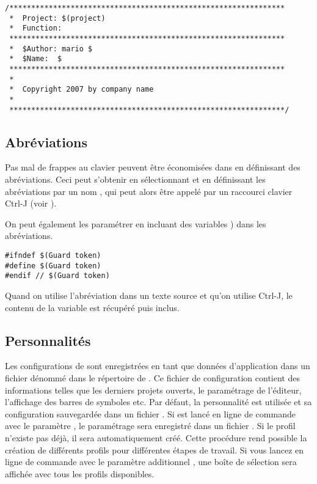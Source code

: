 
\begin{lstlisting}
/***************************************************************
 *  Project: $(project)
 *  Function:
 ***************************************************************
 *  $Author: mario $
 *  $Name:  $
 ***************************************************************
 *
 *  Copyright 2007 by company name
 *
 ***************************************************************/
\end{lstlisting}

\subsection{Abréviations}\label{sec:Abbreviations}

Pas mal de frappes au clavier peuvent être économisées dans \codeblocks en définissant des abréviations. Ceci peut s'obtenir en sélectionnant  et en définissant les abréviations par un nom , qui peut alors être appelé par un raccourci clavier Ctrl-J (voir ).


On peut également les paramétrer en incluant des variables ) dans les abréviations.

\begin{lstlisting}
#ifndef $(Guard token)
#define $(Guard token)
#endif // $(Guard token)
\end{lstlisting}

Quand on utilise l'abréviation  dans un texte source et qu'on utilise Ctrl-J, le contenu de la variable est récupéré puis inclus.

\subsection{Personnalités}\label{sec:personalities}

Les configurations de \codeblocks sont enregistrées en tant que données d'application dans un fichier dénommé  dans le répertoire de . Ce fichier de configuration contient des informations telles que les derniers projets ouverts, le paramétrage de l'éditeur, l'affichage des barres de symboles etc. Par défaut, la personnalité  est utilisée et sa configuration sauvegardée dans un fichier . Si \codeblocks est lancé en ligne de commande avec le paramètre , le paramétrage sera enregistré dans un fichier . Si le profil n'existe pas déjà, il sera automatiquement créé. Cette procédure rend possible la création de différents profils pour différentes étapes de travail. Si vous lancez \codeblocks en ligne de commande avec le paramètre additionnel , une boîte de sélection sera affichée avec tous les profils disponibles.

